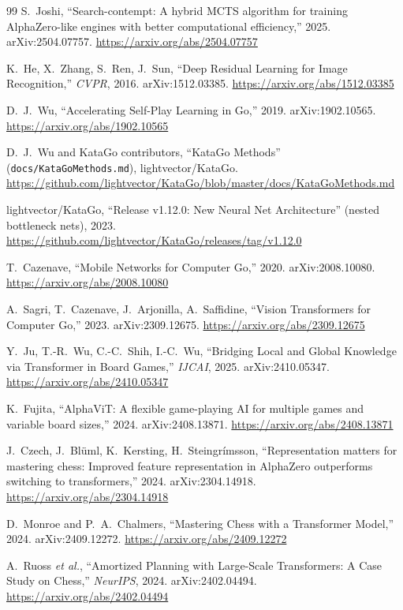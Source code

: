 \documentclass[11pt]{article}
\begin{document}
\begin{thebibliography}{99}
 S.~Joshi,
  ``Search-contempt: A hybrid MCTS algorithm for training AlphaZero-like engines with
  better computational efficiency,'' 2025. arXiv:2504.07757.
  \url{https://arxiv.org/abs/2504.07757}

 K.~He, X.~Zhang, S.~Ren, J.~Sun,
  ``Deep Residual Learning for Image Recognition,'' \emph{CVPR}, 2016. arXiv:1512.03385.
  \url{https://arxiv.org/abs/1512.03385}

 D.~J.~Wu,
  ``Accelerating Self-Play Learning in Go,'' 2019. arXiv:1902.10565.
  \url{https://arxiv.org/abs/1902.10565}

 D.~J.~Wu and KataGo contributors,
  ``KataGo Methods'' (\texttt{docs/KataGoMethods.md}), lightvector/KataGo.
  \url{https://github.com/lightvector/KataGo/blob/master/docs/KataGoMethods.md}

 lightvector/KataGo,
  ``Release v1.12.0: New Neural Net Architecture'' (nested bottleneck nets), 2023.
  \url{https://github.com/lightvector/KataGo/releases/tag/v1.12.0}

 T.~Cazenave,
  ``Mobile Networks for Computer Go,'' 2020. arXiv:2008.10080.
  \url{https://arxiv.org/abs/2008.10080}

 A.~Sagri, T.~Cazenave, J.~Arjonilla, A.~Saffidine,
  ``Vision Transformers for Computer Go,'' 2023. arXiv:2309.12675.
  \url{https://arxiv.org/abs/2309.12675}

 Y.~Ju, T.-R.~Wu, C.-C.~Shih, I.-C.~Wu,
  ``Bridging Local and Global Knowledge via Transformer in Board Games,''
  \emph{IJCAI}, 2025. arXiv:2410.05347. \url{https://arxiv.org/abs/2410.05347}

 K.~Fujita,
  ``AlphaViT: A flexible game-playing AI for multiple games and variable board sizes,''
  2024. arXiv:2408.13871. \url{https://arxiv.org/abs/2408.13871}

 J.~Czech, J.~Bl\"uml, K.~Kersting, H.~Steingr\'imsson,
  ``Representation matters for mastering chess: Improved feature representation in
  AlphaZero outperforms switching to transformers,'' 2024. arXiv:2304.14918.
  \url{https://arxiv.org/abs/2304.14918}

 D.~Monroe and P.~A.~Chalmers,
  ``Mastering Chess with a Transformer Model,'' 2024. arXiv:2409.12272.
  \url{https://arxiv.org/abs/2409.12272}

 A.~Ruoss \emph{et al.},
  ``Amortized Planning with Large-Scale Transformers: A Case Study on Chess,''
  \emph{NeurIPS}, 2024. arXiv:2402.04494. \url{https://arxiv.org/abs/2402.04494}


\end{thebibliography}
\end{document}
